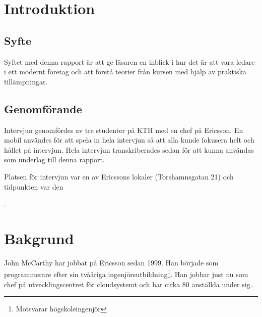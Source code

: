 \section{Introduktion}
\subsection{Syfte}
Syftet med denna rapport är att ge läsaren en inblick i hur det är att vara ledare i ett modernt företag och att förstå teorier från kursen med hjälp av praktiska tillämpningar.

\subsection{Genomförande}
Intervjun genomfördes av tre studenter på KTH med en chef på Ericsson. En mobil användes för att spela in hela intervjun så att alla kunde fokusera helt och hållet på intervjun. Hela intervjun transkriberades sedan för att kunna användas som underlag till denna rapport.

Platsen för intervjun var en av Ericssons lokaler (Torshamnsgatan 21) och tidpunkten var den \date{28 april, 2014}.

\section{Bakgrund}
\label{sec:bakgrund}

John McCarthy har jobbat på Ericsson sedan 1999. Han började som programmerare efter sin tvååriga ingenjörsutbildning\footnote{Motsvarar högskoleingenjör}. Han jobbar just nu som chef på utvecklingscentret för cloudsystemt och har cirka 80 anställda under sig.